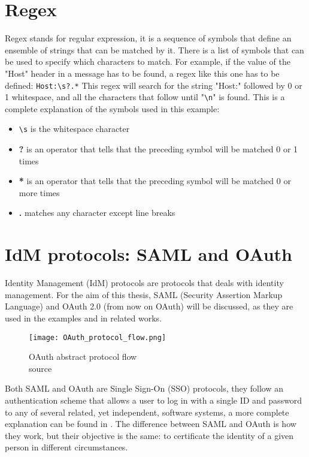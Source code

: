 \section{Regex}
Regex stands for regular expression, it is a sequence of symbols that define an ensemble of strings that can be matched by it. There is a list of symbols that can be used to specify which characters to match. For example, if the value of the "Host" header in a message has to be found, a regex like this one has to be defined: \verb|Host:\s?.*|
This regex will search for the string "Host:" followed by 0 or 1 whitespace, and all the characters that follow until "\verb|\n|" is found. This is a complete explanation of the symbols used in this example:
\begin{itemize}
    \item \verb|\s| is the whitespace character
    \item \textbf{?} is an operator that tells that the preceding symbol will be matched 0 or 1 times
    \item \textbf{*} is an operator that tells that the preceding symbol will be matched 0 or more times
    \item \textbf{.} matches any character except line breaks
\end{itemize}

\section{IdM protocols: SAML and OAuth}
Identity Management (IdM) protocols are protocols that deals with identity management. For the aim of this thesis, \gls{SAML} (Security Assertion Markup Language) and \gls{OAuth} 2.0 (from now on \gls{OAuth}) will be discussed, as they are used in the examples and in related works.
\begin{wrapfigure}{r}{0.5\textwidth}
    \texttt{[image: OAuth\_protocol\_flow.png]}
    \caption{OAuth abstract protocol flow\\source \cite{ietf_oauth2}}
    \label{fig:OAuth_protocol_flow}
\end{wrapfigure}
Both \Gls{SAML} and \gls{OAuth} are Single Sign-On (SSO) protocols, they follow an authentication scheme that allows a user to log in with a single ID and password to any of several related, yet independent, software systems, a more complete explanation can be found in \cite{claudio_grisenti}. 
The difference between \Gls{SAML} and \gls{OAuth} is how they work, but their objective is the same: to certificate the identity of a given person in different circumstances.

